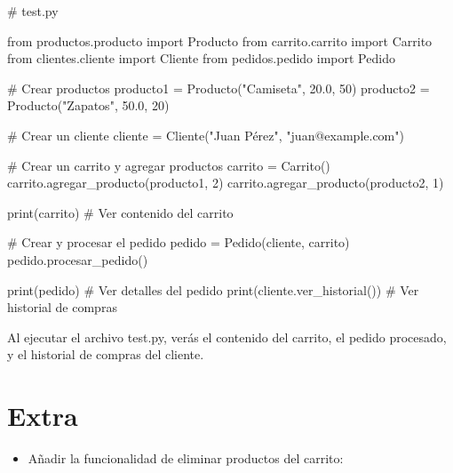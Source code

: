 \documentclass[
  a4paper,
  DIV=11,
  numbers=noendperiod,
  onepage,
  openany]{scrreprt}
\newenvironment{Shaded}{\begin{snugshade}}{\end{snugshade}}
\newcommand{\BuiltInTok}[1]{\textcolor[rgb]{0.00,0.23,0.31}{#1}}
\newcommand{\CommentTok}[1]{\textcolor[rgb]{0.37,0.37,0.37}{#1}}
\newcommand{\DecValTok}[1]{\textcolor[rgb]{0.68,0.00,0.00}{#1}}
\newcommand{\FloatTok}[1]{\textcolor[rgb]{0.68,0.00,0.00}{#1}}
\newcommand{\ImportTok}[1]{\textcolor[rgb]{0.00,0.46,0.62}{#1}}
\newcommand{\NormalTok}[1]{\textcolor[rgb]{0.00,0.23,0.31}{#1}}
\newcommand{\OperatorTok}[1]{\textcolor[rgb]{0.37,0.37,0.37}{#1}}
\newcommand{\StringTok}[1]{\textcolor[rgb]{0.13,0.47,0.30}{#1}}
\providecommand{\tightlist}{%
  \setlength{\itemsep}{0pt}\setlength{\parskip}{0pt}}\usepackage{longtable,booktabs,array}
\begin{document}
\begin{Shaded}
\begin{Highlighting}[]
\CommentTok{\# test.py}

\ImportTok{from}\NormalTok{ productos.producto }\ImportTok{import}\NormalTok{ Producto}
\ImportTok{from}\NormalTok{ carrito.carrito }\ImportTok{import}\NormalTok{ Carrito}
\ImportTok{from}\NormalTok{ clientes.cliente }\ImportTok{import}\NormalTok{ Cliente}
\ImportTok{from}\NormalTok{ pedidos.pedido }\ImportTok{import}\NormalTok{ Pedido}

\CommentTok{\# Crear productos}
\NormalTok{producto1 }\OperatorTok{=}\NormalTok{ Producto(}\StringTok{"Camiseta"}\NormalTok{, }\FloatTok{20.0}\NormalTok{, }\DecValTok{50}\NormalTok{)}
\NormalTok{producto2 }\OperatorTok{=}\NormalTok{ Producto(}\StringTok{"Zapatos"}\NormalTok{, }\FloatTok{50.0}\NormalTok{, }\DecValTok{20}\NormalTok{)}

\CommentTok{\# Crear un cliente}
\NormalTok{cliente }\OperatorTok{=}\NormalTok{ Cliente(}\StringTok{"Juan Pérez"}\NormalTok{, }\StringTok{"juan@example.com"}\NormalTok{)}

\CommentTok{\# Crear un carrito y agregar productos}
\NormalTok{carrito }\OperatorTok{=}\NormalTok{ Carrito()}
\NormalTok{carrito.agregar\_producto(producto1, }\DecValTok{2}\NormalTok{)}
\NormalTok{carrito.agregar\_producto(producto2, }\DecValTok{1}\NormalTok{)}

\BuiltInTok{print}\NormalTok{(carrito)  }\CommentTok{\# Ver contenido del carrito}

\CommentTok{\# Crear y procesar el pedido}
\NormalTok{pedido }\OperatorTok{=}\NormalTok{ Pedido(cliente, carrito)}
\NormalTok{pedido.procesar\_pedido()}

\BuiltInTok{print}\NormalTok{(pedido)  }\CommentTok{\# Ver detalles del pedido}
\BuiltInTok{print}\NormalTok{(cliente.ver\_historial())  }\CommentTok{\# Ver historial de compras}
\end{Highlighting}
\end{Shaded}

Al ejecutar el archivo test.py, verás el contenido del carrito, el
pedido procesado, y el historial de compras del cliente.

\chapter{Extra 🎁}\label{extra-1}

\begin{itemize}
\tightlist
\item
  Añadir la funcionalidad de eliminar productos del carrito:
\end{itemize}
\end{document}
